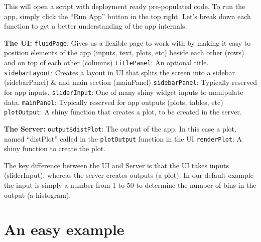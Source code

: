 \documentclass[
]{book}
\begin{document}
This will open a script with deployment ready pre-populated code. To run the app, simply click the ``Run App'' button in the top right. Let's break down each function to get a better understanding of the app internals.

\textbf{The UI:}
\texttt{fluidPage}: Gives us a flexible page to work with by making it easy to position elements of the app (inputs, text, plots, etc) beside each other (rows) and on top of each other (columns)
\texttt{titlePanel}: An optional title.
\texttt{sidebarLayout}: Creates a layout in UI that splits the screen into a sidebar (sidebarPanel) \& and main section (mainPanel)
\texttt{sidebarPanel}: Typically reserved for app inputs.
\texttt{sliderInput}: One of many shiny widget inputs to manipulate data.
\texttt{mainPanel}: Typically reserved for app outputs (plots, tables, etc)
\texttt{plotOutput}: A shiny function that creates a plot, to be created in the server.

\textbf{The Server:}
\texttt{output\$distPlot}: The output of the app. In this case a plot, named ``distPlot'' called in the \texttt{plotOutput} function in the UI
\texttt{renderPlot}: A shiny function to create the plot.

The key difference between the UI and Server is that the UI takes inputs (sliderInput), whereas the server creates outputs (a plot). In our default example the input is simply a number from 1 to 50 to determine the number of bins in the output (a histogram).

\hypertarget{an-easy-example}{%
\section{An easy example}\label{an-easy-example}}
\end{document}
